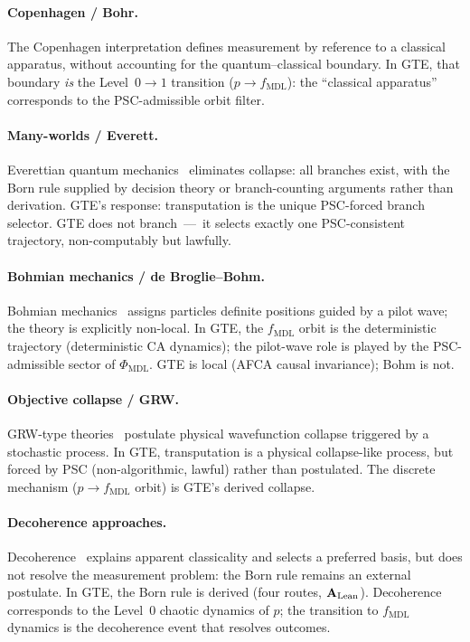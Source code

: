 \documentclass[11pt]{article}
\theoremstyle{remark}
\newcommand{\PHIMDL}{\ensuremath{\Phi_{\mathrm{MDL}}}}
\newcommand{\fmdl}{\ensuremath{f_{\mathrm{MDL}}}}
\newcommand{\CatAL}{\ensuremath{\textbf{A}_{\rm Lean}}}
\begin{document}
\paragraph{Copenhagen / Bohr.}
The Copenhagen interpretation defines measurement by reference to a classical
apparatus, without accounting for the quantum--classical boundary.
In GTE, that boundary \emph{is} the Level~$0\to1$ transition ($p \to \fmdl{}$):
the ``classical apparatus'' corresponds to the PSC-admissible orbit filter.

\paragraph{Many-worlds / Everett.}
Everettian quantum mechanics~\cite{Everett1957} eliminates collapse: all branches
exist, with the Born rule supplied by decision theory or branch-counting
arguments rather than derivation.
GTE's response: transputation is the unique PSC-forced branch selector.
GTE does not branch~---~it selects exactly one PSC-consistent trajectory,
non-computably but lawfully.

\paragraph{Bohmian mechanics / de Broglie--Bohm.}
Bohmian mechanics~\cite{Bohm1952} assigns particles definite positions guided
by a pilot wave; the theory is explicitly non-local.
In GTE, the \fmdl{} orbit is the deterministic trajectory (deterministic CA
dynamics); the pilot-wave role is played by the PSC-admissible sector of
$\PHIMDL$.
GTE is local (AFCA causal invariance); Bohm is not.

\paragraph{Objective collapse / GRW.}
GRW-type theories~\cite{GhirardiRiminiWeber1986} postulate physical wavefunction
collapse triggered by a stochastic process.
In GTE, transputation is a physical collapse-like process, but forced by PSC
(non-algorithmic, lawful) rather than postulated.
The discrete mechanism ($p \to \fmdl{}$ orbit) is GTE's derived collapse.

\paragraph{Decoherence approaches.}
Decoherence~\cite{Zurek2003} explains apparent classicality and selects a
preferred basis, but does not resolve the measurement problem: the Born rule
remains an external postulate.
In GTE, the Born rule is derived (four routes, \CatAL).
Decoherence corresponds to the Level~0 chaotic dynamics of $p$; the transition
to \fmdl{} dynamics is the decoherence event that resolves outcomes.
\end{document}
